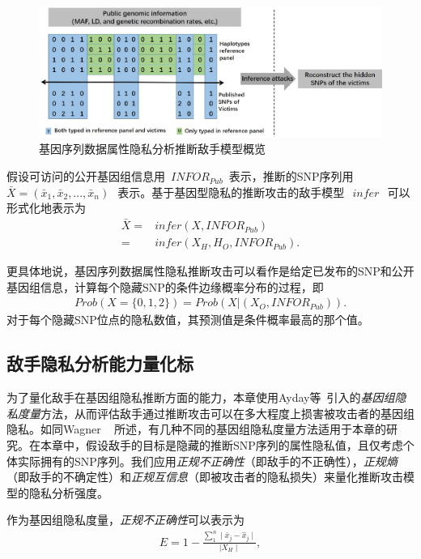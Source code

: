 \begin{figure}[htbp]
	\centering
	\includegraphics[width = 0.95\linewidth]{./figures/Fig2-adversary-model.eps}
	\caption{基因序列数据属性隐私分析推断敌手模型概览}
	\label{fig:adversary-model}
\end{figure}

假设可访问的公开基因组信息用~${INFOR}_{Pub}$~表示，推断的SNP序列用~$\bar{X}=(\bar{x}_1, \bar{x}_2,...,\bar{x}_n)~$~表示。基于基因型隐私的推断攻击的敌手模型~$~infer~$~可以形式化地表示为
\begin{align}\label{eq:adversary-model}
\bar{X} =& infer(X,{INFOR}_{Pub})  \nonumber \\
= & infer(X_H,H_O,{INFOR}_{Pub}).
\end{align}

更具体地说，基因序列数据属性隐私推断攻击可以看作是给定已发布的SNP和公开基因组信息，计算每个隐藏SNP的条件边缘概率分布的过程，即
\begin{align}\label{eq:adversary-model-prob}
Prob(X=\{0,1,2\})=Prob(X|(X_O,{INFOR}_{Pub})).
\end{align}
对于每个隐藏SNP位点的隐私数值，其预测值是条件概率最高的那个值。

\subsection{敌手隐私分析能力量化标}


为了量化敌手在基因组隐私推断方面的能力，本章使用Ayday等~\cite{ayday2013personal}引入的\textit{基因组隐私度量}方法，从而评估敌手通过推断攻击可以在多大程度上损害被攻击者的基因组隐私。如同Wagner
~\cite{wagner2017evaluating}
所述，有几种不同的基因组隐私度量方法适用于本章的研究。在本章中，假设敌手的目标是隐藏的推断SNP序列的属性隐私值，且仅考虑个体实际拥有的SNP序列。我们应用\textit{正规不正确性}（即敌手的不正确性），\textit{正规熵}（即敌手的不确定性）和\textit{正规互信息}（即被攻击者的隐私损失）来量化推断攻击模型的隐私分析强度。

作为基因组隐私度量，\textit{正规不正确性}可以表示为
\begin{align}\label{eq:metric-correctness}
E=1- \frac{\sum_1^n \mid \bar{x}_j - \hat{x}_j \mid}  {\mid X_H \mid},
\end{align}


